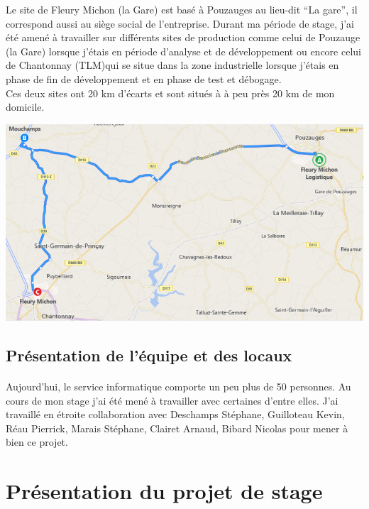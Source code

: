 \documentclass[a4paper,12pt]{extarticle}
\begin{document}
	Le site de Fleury Michon (la Gare) est basé à Pouzauges au lieu-dit “La gare”, il correspond aussi au siège social de l’entreprise. Durant ma période de stage, j’ai été amené à travailler sur différents sites de production comme celui de Pouzauge (la Gare) lorsque j’étais en période d’analyse et de développement ou encore celui de Chantonnay (TLM)qui se situe dans la zone industrielle lorsque j’étais en phase de fin de développement et en phase de test et débogage.\\
Ces deux sites ont 20 km d’écarts et sont situés à à peu près 20 km de mon domicile.\\

	\centerline{\includegraphics[scale=0.40]{Img/Img_SituationGeo}}

	\subsection{Présentation de l'équipe et des locaux}
		\paragraph{}

	Aujourd’hui, le service informatique comporte un peu plus de 50 personnes. Au cours de mon stage j’ai été mené à travailler avec certaines d’entre elles.
J’ai travaillé en étroite collaboration avec Deschamps Stéphane, Guilloteau Kevin, Réau Pierrick, Marais Stéphane, Clairet Arnaud, Bibard Nicolas pour mener à bien ce projet.\\

	\clearpage
	
	\section{Présentation du projet de stage}
	
\end{document}
